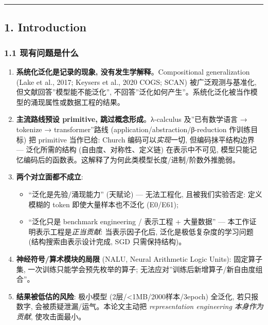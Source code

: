 \documentclass[
]{article}
\providecommand{\tightlist}{%
  \setlength{\itemsep}{0pt}\setlength{\parskip}{0pt}}
\begin{document}
\begin{center}\rule{0.5\linewidth}{0.5pt}\end{center}

\subsection{1. Introduction}\label{introduction}

\subsubsection{1.1
现有问题是什么}\label{ux73b0ux6709ux95eeux9898ux662fux4ec0ux4e48}

\begin{enumerate}
\def\labelenumi{\arabic{enumi}.}
\tightlist
\item
  \textbf{系统化泛化是记录的现象, 没有发生学解释}。Compositional
  generalization (Lake et al., 2017; Keysers et al., 2020 COGS; SCAN)
  被广泛观测与基准化, 但文献回答''模型能不能泛化'',
  不回答''泛化如何产生''。系统化泛化被当作模型的涌现属性或数据工程的结果。
\item
  \textbf{主流路线预设 primitive, 跳过概念形成}。λ-calculus
  及''已有数学语言 → tokenize → transformer''路线
  (application/abstraction/β-reduction 作训练目标) 把 primitive
  当作已给: Church 编码可以\emph{实现}一切, 但编码抹平结构边界 ---
  泛化所需的结构 (自由度、对称性、定义链) 在表示中不可见,
  模型只能记忆编码后的函数表。这解释了为何此类模型长度/进制/阶数外推脆弱。
\item
  \textbf{两个对立面都不成立}:

  \begin{itemize}
  \tightlist
  \item
    ``泛化是先验/涌现能力'' (天赋论) --- 无法工程化, 且被我们实验否定:
    定义模糊的 token 即使大量样本也不泛化 (E0/E61);
  \item
    ``泛化只是 benchmark engineering / 表示工程 + 大量数据'' ---
    本工作证明表示工程是\emph{正当贡献}: 当表示因子化后,
    泛化是极低复杂度的学习问题 (结构搜索由表示设计完成, SGD
    只需保持结构)。
  \end{itemize}
\item
  \textbf{神经符号/算术模块的局限} (NALU, Neural Arithmetic Logic
  Units): 固定算子集, 一次训练只能学会预先枚举的算子;
  无法应对''训练后新增算子/新自由度组合''。
\item
  \textbf{结果被低估的风险}: 极小模型 (2层/\textless1MB/2000样本/3epoch)
  全泛化, 若只报数字, 会被质疑泄漏/运气。本论文主动把
  \emph{representation engineering 本身作为贡献}, 使攻击面最小。
\end{enumerate}
\end{document}

